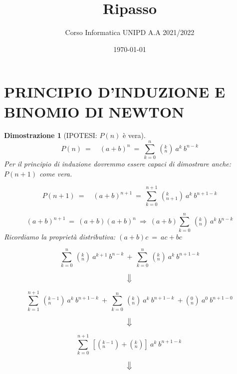 \documentclass[12pt, a4paper]{article}
\title{Ripasso}
\author{Corso Informatica UNIPD A.A 2021/2022}
\date{\today}
\theoremstyle{break}
\theoremstyle{lemma}
\theoremstyle{lemma}
\newtheorem{dimo}{Dimostrazione}
\theoremstyle{lemma}
\begin{document}
\maketitle

\section{PRINCIPIO D'INDUZIONE E BINOMIO DI NEWTON}
\begin{dimo}[IPOTESI: $P(n)$ è vera]
	
	\begin{equation}
	P(n)\ =\quad (a+b)^n\ =\ \sum_{k=0}^{n}\ (_{n}^{k})\ a^k\ b^{n-k}
	\end{equation}
Per il principio di induzione dovremmo essere capaci di dimostrare anche: 
$P(n+1)$ come vera.

	\begin{equation}
	P(n+1)\ =\quad (a+b)^{n+1}\ =\ 
	\sum_{k=0}^{n+1}\ (_{n+1}^{k})\ a^k\ b^{n+1-k} 
	\end{equation}

	\begin{equation}
	(a+b)^{n+1}\ =\ (a+b)(a+b)^n\ \Rightarrow\ 
	(a+b)\sum_{k=0}^{n}\ (_{n}^{k})\ a^k\ b^{n-k}
	\end{equation}
Ricordiamo la proprietà distributiva: $(a+b)c\ =\ ac + bc$

	\begin{equation}
	\sum_{k=0}^{n}\ (_{n}^{k})\ a^{k+1}\ b^{n-k}\ +\ 
	\sum_{k=0}^{n}\ (_{n}^{k})\ a^k\ b^{n+1-k}
	\end{equation}

	\begin{equation} 
	\big\Downarrow
	\end{equation}

	\begin{equation}
	\sum_{k=1}^{n+1}\ (_{n}^{k-1})\ a^{k}\ b^{n+1-k}\ + \ 
	\sum_{k=0}^{n}\ (_{n}^{k})\ a^k\ b^{n+1-k}\ + (_{n}^{0})\ a^0\ b^{n+1-0}
	\end{equation}

	\begin{equation} 
	\big\Downarrow
	\end{equation}
	
	\begin{equation}
	\sum_{k=0}^{n+1}\ [(_{n}^{k-1}) + (_{n}^{k})]\ a^{k}\ b^{n+1-k}\
	\end{equation}
	
	\begin{equation}
	\big\Downarrow
	\end{equation}
	

\end{dimo}
\end{document}
